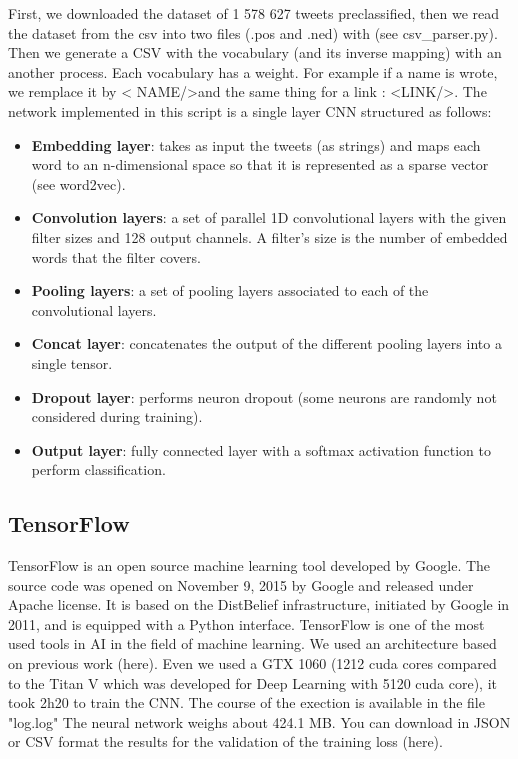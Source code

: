 \documentclass{acmtog} %
\begin{document}
First, we downloaded the dataset of 1 578 627 tweets preclassified, then we read the dataset from the csv into two files (.pos and .ned) with (see csv\_parser.py). Then we generate a CSV with the vocabulary (and its inverse mapping) with an another process. Each vocabulary has a weight.
For example if a name is wrote, we remplace it by \textless 
NAME/\textgreater and the same thing for a link : \textless LINK/\textgreater.
The network implemented in this script is a single layer CNN structured as follows:
\begin{itemize}
\item  \textbf{Embedding layer}: takes as input the tweets (as strings) and maps each word to an n-dimensional space so that it is represented as a sparse vector (see word2vec).
\item  \textbf{Convolution layers}: a set of parallel 1D convolutional layers with the given filter sizes and 128 output channels. A filter's size is the number of embedded words that the filter covers.
\item  \textbf{Pooling layers}: a set of pooling layers associated to each of the convolutional layers.
\item  \textbf{Concat layer}: concatenates the output of the different pooling layers into a single tensor.
\item  \textbf{Dropout layer}: performs neuron dropout (some neurons are randomly not considered during training).
\item  \textbf{Output layer}: fully connected layer with a softmax activation function to perform classification.
\end{itemize}

\subsection{TensorFlow}
\label{subsub:dl}

TensorFlow is an open source machine learning tool developed by Google. The source code was opened on November 9, 2015 by Google and released under Apache license.
It is based on the DistBelief infrastructure, initiated by Google in 2011, and is equipped with a Python interface.
TensorFlow is one of the most used tools in AI in the field of machine learning.
We used an architecture based on previous work (here).
Even we used a GTX 1060 (1212 cuda cores compared to the Titan V which was developed for Deep Learning with 5120 cuda core), it took 2h20 to train the CNN.
The course of the exection is available in the file "log.log"
The neural network weighs about 424.1 MB.
You can download in JSON or CSV format the results for the validation of the training loss (here).
\end{document}
